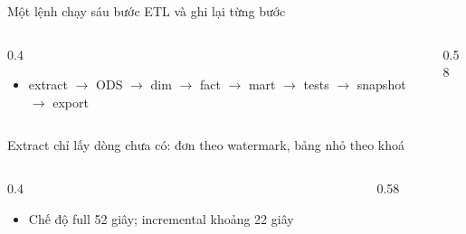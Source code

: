 \begin{frame}{Một lệnh chạy sáu bước ETL và ghi lại từng bước}
\begin{columns}[T]\begin{column}{0.4\textwidth}
\begin{itemize}
  \item extract $\rightarrow$ ODS $\rightarrow$ dim $\rightarrow$ fact $\rightarrow$ mart $\rightarrow$ tests $\rightarrow$ snapshot $\rightarrow$ export
\end{itemize}
\end{column}\begin{column}{0.58\textwidth}
\begin{center}\end{center}
\end{column}\end{columns}

\end{frame}

\begin{frame}{Extract chỉ lấy dòng chưa có: đơn theo watermark, bảng nhỏ theo khoá}
\begin{columns}[T]\begin{column}{0.4\textwidth}
\begin{itemize}
  \item Chế độ full 52 giây; incremental khoảng 22 giây
\end{itemize}
\end{column}\begin{column}{0.58\textwidth}
\begin{center}\end{center}
\end{column}\end{columns}

\end{frame}

